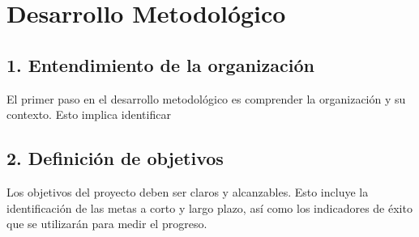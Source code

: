 \chapter{Desarrollo Metodológico}

\section*{1. Entendimiento de la organización}
El primer paso en el desarrollo metodológico es comprender la organización y su contexto. Esto implica identificar

\section*{2. Definición de objetivos}
Los objetivos del proyecto deben ser claros y alcanzables. Esto incluye la identificación de las metas a corto y largo plazo, así como los indicadores de éxito que se utilizarán para medir el progreso.
